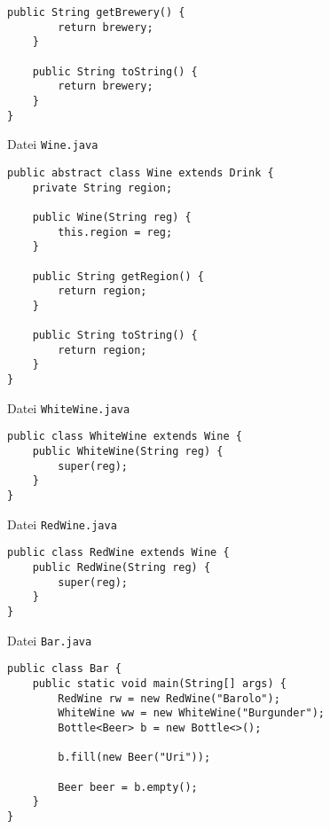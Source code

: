 \documentclass{article}
\begin{document}
\begin{enumerate}[label=(\alph*)]
\begin{lstlisting}[style=java, tabsize=2]
	public String getBrewery() {
		return brewery;
	}
		
	public String toString() {
		return brewery;
	}
}
		\end{lstlisting}
		Datei \texttt{Wine.java}
		\begin{lstlisting}[style=java,tabsize=2]
public abstract class Wine extends Drink {
	private String region;
		
	public Wine(String reg) {
		this.region = reg;
	}
		
	public String getRegion() {
		return region;
	}
		
	public String toString() {
		return region;
	}
}
		\end{lstlisting}
		Datei \texttt{WhiteWine.java}
		\begin{lstlisting}[style=java, tabsize=2]
public class WhiteWine extends Wine {
	public WhiteWine(String reg) {
		super(reg);
	}
}
		\end{lstlisting}
		Datei \texttt{RedWine.java}
		\begin{lstlisting}[style=java,tabsize=2]
public class RedWine extends Wine {
	public RedWine(String reg) {
		super(reg);
	}
}
		\end{lstlisting}
		Datei \texttt{Bar.java}
		\begin{lstlisting}[style=java,tabsize=2]
public class Bar {
	public static void main(String[] args) {
		RedWine rw = new RedWine("Barolo");
		WhiteWine ww = new WhiteWine("Burgunder");
		Bottle<Beer> b = new Bottle<>();

		b.fill(new Beer("Uri"));

		Beer beer = b.empty();
	}
}
		\end{lstlisting}
	\end{enumerate}
\end{document}
